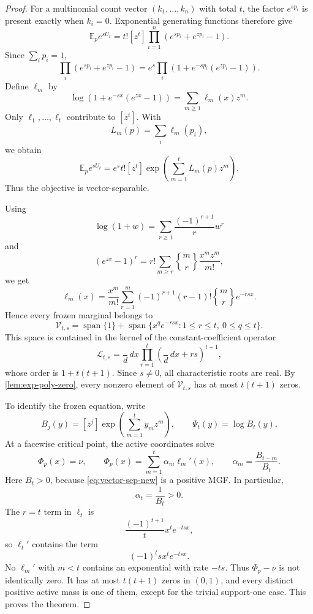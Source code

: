 \documentclass[11pt]{article}
\theoremstyle{plain}
\theoremstyle{definition}
\theoremstyle{remark}
\newcommand{\E}{\mathbb E}
\newcommand{\dd}{\,d}
\newcommand{\Span}{\operatorname{span}}
\newcommand{\stir}[2]{\genfrac{\{} {\}}{0pt}{}{#1}{#2}}
\newcommand{\cV}{\mathcal V}
\newcommand{\cL}{\mathcal L}
\begin{document}
\begin{proof}
For a multinomial count vector \((k_1,\ldots,k_n)\) with total \(t\), the factor \(e^{sp_i}\) is present exactly when \(k_i=0\).  Exponential generating functions therefore give
\begin{equation}\label{eq:fixed-coeff-new}
\E_p e^{sU_t}
=t![z^t]\prod_{i=1}^n\left(e^{sp_i}+e^{zp_i}-1\right).
\end{equation}
Since \(\sum_i p_i=1\),
\[
\prod_i\left(e^{sp_i}+e^{zp_i}-1\right)
=e^s\prod_i\left(1+e^{-sp_i}(e^{zp_i}-1)\right).
\]
Define \(\ell_m\) by
\begin{equation}\label{eq:ell-new}
\log\left(1+e^{-sx}(e^{zx}-1)\right)
=\sum_{m\ge1}\ell_m(x)z^m.
\end{equation}
Only \(\ell_1,\ldots,\ell_t\) contribute to \([z^t]\).  With
\[
L_m(p)=\sum_i\ell_m(p_i),
\]
we obtain
\begin{equation}\label{eq:vector-sep-new}
\E_p e^{sU_t}
=e^s t![z^t]\exp\left(\sum_{m=1}^tL_m(p)z^m\right).
\end{equation}
Thus the objective is vector-separable.

Using
\[
\log(1+w)=\sum_{r\ge1}\frac{(-1)^{r+1}}r w^r
\]
and
\[
(e^{zx}-1)^r
=r!\sum_{m\ge r}\stir{m}{r}\frac{x^mz^m}{m!},
\]
we get
\begin{equation}\label{eq:ell-explicit-new}
\ell_m(x)
=\frac{x^m}{m!}
\sum_{r=1}^m(-1)^{r+1}(r-1)!\stir{m}{r}e^{-rsx}.
\end{equation}
Hence every frozen marginal belongs to
\begin{equation}\label{eq:V-new}
\cV_{t,s}
=\Span\{1\}
+\Span\{x^q e^{-rsx}:1\le r\le t,\ 0\le q\le t\}.
\end{equation}
This space is contained in the kernel of the constant-coefficient operator
\begin{equation}\label{eq:annihilator-new}
\cL_{t,s}
=\frac\dd{\dd x}
\prod_{r=1}^t\left(\frac\dd{\dd x}+rs\right)^{t+1},
\end{equation}
whose order is \(1+t(t+1)\).  Since \(s\ne0\), all characteristic roots are real.  By \cref{lem:exp-poly-zero}, every nonzero element of \(\cV_{t,s}\) has at most \(t(t+1)\) zeros.

To identify the frozen equation, write
\[
B_j(y)=[z^j]\exp\left(\sum_{m=1}^t y_mz^m\right),
\qquad
\Psi_t(y)=\log B_t(y).
\]
At a facewise critical point, the active coordinates solve
\begin{equation}\label{eq:frozen-fixed-new}
\Phi_p(x)=\nu,
\qquad
\Phi_p(x)=\sum_{m=1}^t\alpha_m\ell_m'(x),
\qquad
\alpha_m=\frac{B_{t-m}}{B_t}.
\end{equation}
Here \(B_t>0\), because \eqref{eq:vector-sep-new} is a positive MGF.  In particular,
\[
\alpha_t=\frac1{B_t}>0.
\]
The \(r=t\) term in \(\ell_t\) is
\[
\frac{(-1)^{t+1}}t x^te^{-tsx},
\]
so \(\ell_t'\) contains the term
\[
(-1)^t s x^te^{-tsx}.
\]
No \(\ell_m'\) with \(m<t\) contains an exponential with rate \(-ts\).  Thus \(\Phi_p-\nu\) is not identically zero.  It has at most \(t(t+1)\) zeros in \((0,1)\), and every distinct positive active mass is one of them, except for the trivial support-one case.  This proves the theorem.
\end{proof}
\end{document}
